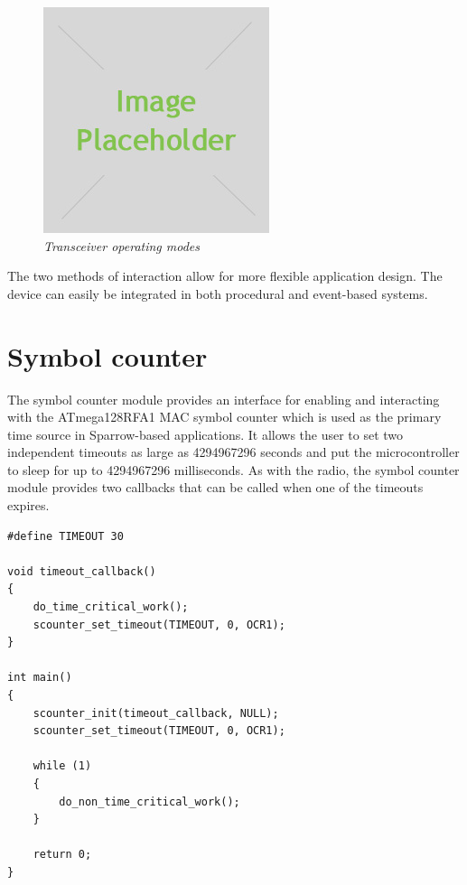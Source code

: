 \begin{figure}[ht]
	\begin{center}
		\includegraphics{img/placeholder.jpg}
	\end{center}
	\caption{\small \itshape{Transceiver operating modes}}
\end{figure}

The two methods of interaction allow for more flexible application design.
The device can easily be integrated in both procedural and event-based systems.

\section{Symbol counter}

The symbol counter module provides an interface for enabling and interacting
with the ATmega128RFA1 MAC symbol counter which is used as the primary time
source in Sparrow-based applications. It allows the user to set two independent
timeouts as large as 4294967296 seconds and put the microcontroller to sleep
for up to 4294967296 milliseconds. As with the radio, the symbol counter module
provides two callbacks that can be called when one of the timeouts expires.

\lstset{
	language=C, numbers=none, caption=Time critical action snippet,
	label=lst:scounter_snippet
}
\begin{lstlisting}
#define TIMEOUT	30

void timeout_callback()
{
	do_time_critical_work();
	scounter_set_timeout(TIMEOUT, 0, OCR1);
}

int main()
{
	scounter_init(timeout_callback, NULL);
	scounter_set_timeout(TIMEOUT, 0, OCR1);

	while (1)
	{
		do_non_time_critical_work();
	}

	return 0;
}
\end{lstlisting}

